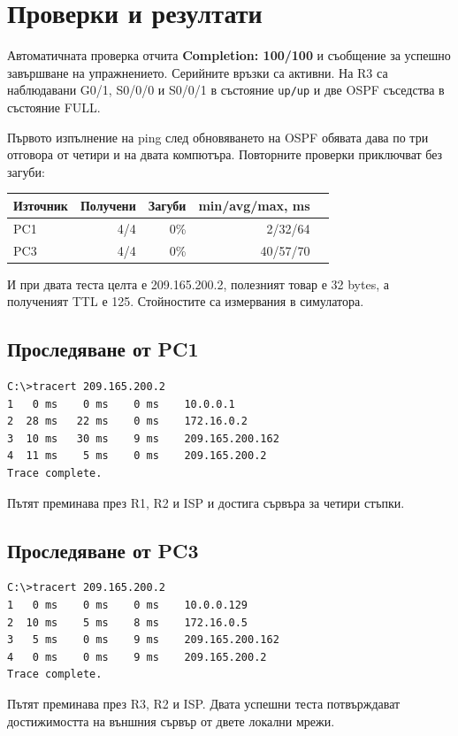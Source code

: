 \documentclass[12pt]{article}
\begin{document}
\section{Проверки и резултати}
Автоматичната проверка отчита \textbf{Completion: 100/100} и съобщение за успешно завършване на упражнението. Серийните връзки са активни. На R3 са наблюдавани G0/1, S0/0/0 и S0/0/1 в състояние \texttt{up/up} и две OSPF съседства в състояние FULL.

Първото изпълнение на ping след обновяването на OSPF обявата дава по три отговора от четири и на двата компютъра. Повторните проверки приключват без загуби:
\begin{center}
\begin{tabular}{lrrrr}
\toprule Източник & Получени & Загуби & min/avg/max, ms \\\midrule
PC1 & 4/4 & 0\% & 2/32/64 \\
PC3 & 4/4 & 0\% & 40/57/70 \\\bottomrule
\end{tabular}
\end{center}
И при двата теста целта е 209.165.200.2, полезният товар е 32 bytes, а полученият TTL е 125. Стойностите са измервания в симулатора.

\subsection{Проследяване от PC1}
\begin{lstlisting}
C:\>tracert 209.165.200.2
1   0 ms    0 ms    0 ms    10.0.0.1
2  28 ms   22 ms    0 ms    172.16.0.2
3  10 ms   30 ms    9 ms    209.165.200.162
4  11 ms    5 ms    0 ms    209.165.200.2
Trace complete.
\end{lstlisting}
Пътят преминава през R1, R2 и ISP и достига сървъра за четири стъпки.

\subsection{Проследяване от PC3}
\begin{lstlisting}
C:\>tracert 209.165.200.2
1   0 ms    0 ms    0 ms    10.0.0.129
2  10 ms    5 ms    8 ms    172.16.0.5
3   5 ms    0 ms    9 ms    209.165.200.162
4   0 ms    0 ms    9 ms    209.165.200.2
Trace complete.
\end{lstlisting}
Пътят преминава през R3, R2 и ISP. Двата успешни теста потвърждават достижимостта на външния сървър от двете локални мрежи.
\end{document}
